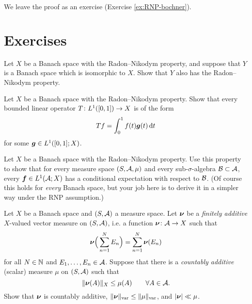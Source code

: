 We leave the proof as an exercise (Exercise \ref{ex:RNP-bochner}). 

  


  


\section*{Exercises}

\begin{exercise}
  Let $X$ be a Banach space with the Radon--Nikodym property, and suppose that $Y$ is a Banach space which is isomorphic to $X$.
  Show that $Y$ also has the Radon--Nikodym property.
\end{exercise}

\begin{exercise}
  Let $X$ be a Banach space with the Radon--Nikodym property.
  Show that every bounded linear operator $T \colon L^1([0,1]) \rightarrow X$ is of the form
  \begin{equation*}
    Tf = \int_0^1 f(t) \bm{g}(t) \, \mathrm{d} t
  \end{equation*}
  for some $\bm{g} \in L^1([0,1];X)$.
\end{exercise}

\begin{exercise}
  Let $X$ be a Banach space with the Radon--Nikodym property.
  Use this property to show that for every measure space $(S,\mathcal{A},\mu)$ and every sub-$\sigma$-algebra $\mathcal{B} \subset \mathcal{A}$, every $\bm{f} \in L^1(\mathcal{A};X)$ has a conditional expectation with respect to $\mathcal{B}$.
  (Of course this holds for \emph{every} Banach space, but your job here is to derive it in a simpler way under the RNP assumption.)
\end{exercise}

\begin{exercise}\label{ex:fa-meas-ca}
  Let $X$ be a Banach space and $(S,\mathcal{A})$ a measure space.
  Let $\bm{\nu}$ be a \emph{finitely additive} $X$-valued vector measure on $(S,\mathcal{A})$, i.e. a function $\bm{\nu} \colon \mathcal{A} \rightarrow X$ such that
  \begin{equation*}
    \bm{\nu}\Big(\sum_{n=1}^{N} E_n\Big) = \sum_{n=1}^{N} \bm{\nu}(E_n)
  \end{equation*}
  for all $N \in \mathbb{N}$ and $E_1,\ldots,E_n \in \mathcal{A}$.
  Suppose that there is a \emph{countably additive} (scalar) measure $\mu$ on $(S,\mathcal{A})$ such that
  \begin{equation*}
    \|\bm{\nu}(A)\|_{X} \leq \mu(A) \qquad \forall A \in \mathcal{A}.
  \end{equation*}
  Show that $\bm{\nu}$ is countably additive, $\|\bm{\nu}\|_{\mathrm{var}} \leq \|\mu\|_{\mathrm{var}}$, and $|\bm{\nu}| \ll \mu$.
\end{exercise}

